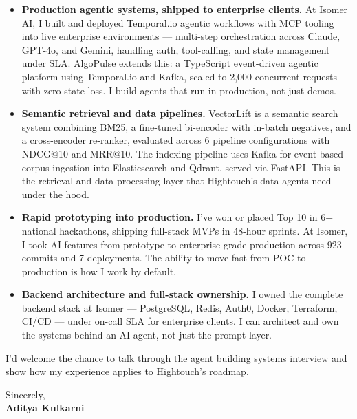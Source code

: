 \documentclass[11pt]{article}
\begin{document}
\begin{itemize}[leftmargin=1.2em, itemsep=4pt]
  \item[\textcolor{HightouchPurple}{\faAngleRight}] \textbf{Production agentic systems, shipped to enterprise clients.} At Isomer AI, I built and deployed Temporal.io agentic workflows with MCP tooling into live enterprise environments — multi-step orchestration across Claude, GPT-4o, and Gemini, handling auth, tool-calling, and state management under SLA. AlgoPulse extends this: a TypeScript event-driven agentic platform using Temporal.io and Kafka, scaled to 2,000 concurrent requests with zero state loss. I build agents that run in production, not just demos.
  \item[\textcolor{HightouchPurple}{\faAngleRight}] \textbf{Semantic retrieval and data pipelines.} VectorLift is a semantic search system combining BM25, a fine-tuned bi-encoder with in-batch negatives, and a cross-encoder re-ranker, evaluated across 6 pipeline configurations with NDCG@10 and MRR@10. The indexing pipeline uses Kafka for event-based corpus ingestion into Elasticsearch and Qdrant, served via FastAPI. This is the retrieval and data processing layer that Hightouch's data agents need under the hood.
  \item[\textcolor{HightouchPurple}{\faAngleRight}] \textbf{Rapid prototyping into production.} I've won or placed Top 10 in 6+ national hackathons, shipping full-stack MVPs in 48-hour sprints. At Isomer, I took AI features from prototype to enterprise-grade production across 923 commits and 7 deployments. The ability to move fast from POC to production is how I work by default.
  \item[\textcolor{HightouchPurple}{\faAngleRight}] \textbf{Backend architecture and full-stack ownership.} I owned the complete backend stack at Isomer — PostgreSQL, Redis, Auth0, Docker, Terraform, CI/CD — under on-call SLA for enterprise clients. I can architect and own the systems behind an AI agent, not just the prompt layer.
\end{itemize}

\vspace{8pt}

I'd welcome the chance to talk through the agent building systems interview and show how my experience applies to Hightouch's roadmap.

\vspace{10pt}

Sincerely, \\[4pt]
\textbf{Aditya Kulkarni}
\end{document}
